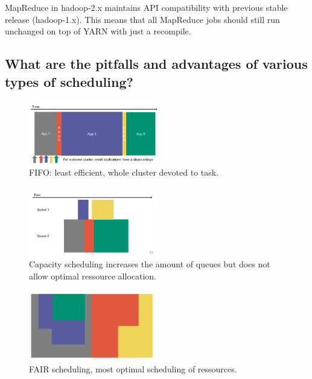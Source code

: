 \documentclass{article}
\begin{document}
MapReduce in hadoop-2.x maintains API compatibility with previous stable release (hadoop-1.x). This means that all MapReduce jobs should still run unchanged on top of YARN with just a recompile.


\subsection{What are the pitfalls and advantages of various types of scheduling?}

\begin{figure}
  \centering
  \includegraphics[width=0.5\textwidth]{img/fifo.png}
  \caption{FIFO: least efficient, whole cluster devoted to task.}
  \label{fig:fifo}
\end{figure}

\begin{figure}
  \centering
  \includegraphics[width=0.5\textwidth]{img/capacity_scheduling.png}
  \caption{Capacity scheduling increases the amount of queues but does not allow optimal ressource allocation.}
  \label{fig:capsched}
\end{figure}

\begin{figure}
  \centering
  \includegraphics[width=0.5\textwidth]{img/fair.png}
  \caption{FAIR scheduling, most optimal scheduling of ressources.}
  \label{fig:fairsched}
\end{figure}
\end{document}
